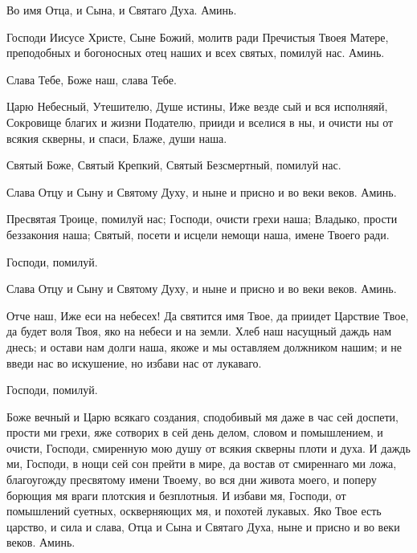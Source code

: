 \mychapterending


\begin{mymulticols}


Во имя Отца, и Сына, и Святаго Духа. Аминь.

Господи Иисусе Христе, Сыне Божий, молитв ради Пречистыя Твоея Матере, преподобных и богоносных отец наших и всех святых, помилуй нас. Аминь.

Слава Тебе, Боже наш, слава Тебе.

Царю Небесный, Утешителю, Душе истины, Иже везде сый и вся исполняяй, Сокровище благих и жизни Подателю, прииди и вселися в ны, и очисти ны от всякия скверны, и спаси, Блаже, души наша.

Святый Боже, Святый Крепкий, Святый Безсмертный, помилуй нас.

Слава Отцу и Сыну и Святому Духу, и ныне и присно и во веки веков. Аминь.

Пресвятая Троице, помилуй нас; Господи, очисти грехи наша; Владыко, прости беззакония наша; Святый, посети и исцели немощи наша, имене Твоего ради.

Господи, помилуй. 

Слава Отцу и Сыну и Святому Духу, и ныне и присно и во веки веков. Аминь.

Отче наш, Иже еси на небесех! Да святится имя Твое, да приидет Царствие Твое, да будет воля Твоя, яко на небеси и на земли. Хлеб наш насущный даждь нам днесь; и остави нам долги наша, якоже и мы оставляем должником нашим; и не введи нас во искушение, но избави нас от лукаваго.


\TroparPomilujNas

Господи, помилуй. 


Боже вечный и Царю всякаго создания, сподобивый мя даже в час сей доспети, прости ми грехи, яже сотворих в сей день делом, словом и помышлением, и очисти, Господи, смиренную мою душу от всякия скверны плоти и духа. И даждь ми, Господи, в нощи сей сон прейти в мире, да востав от смиреннаго ми ложа, благоугожду пресвятому имени Твоему, во вся дни живота моего, и поперу борющия мя враги плотския и безплотныя. И избави мя, Господи, от помышлений суетных, оскверняющих мя, и похотей лукавых. Яко Твое есть царство, и сила и слава, Отца и Сына и Святаго Духа, ныне и присно и во веки веков. Аминь.


\end{mymulticols}
